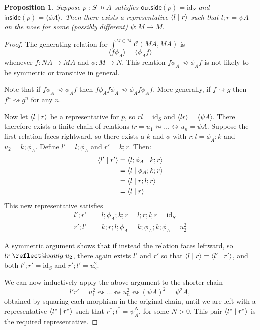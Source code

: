 \documentclass[11pt,a4paper]{article}
\makeatletter
\theoremstyle{plain}
\newtheorem{proposition}[theorem]{Proposition}
\theoremstyle{definition}
\newcommand{\C}{\mathscr{C}}
\newcommand{\M}{\mathscr{M}}
\newcommand{\id}{\mathrm{id}}
\newcommand{\rep}[2]{{\ensuremath \left\langle #1 \mid #2 \right\rangle}}
\newcommand{\inside}{\mathsf{inside}}
\newcommand{\outside}{\mathsf{outside}}
\newcommand{\hto}{\ensuremath{\,\mathaccent\shortmid\rightarrow\,}}
\providecommand{\leftsquigarrow}{%
  \mathrel{\mathpalette\reflect@squig\relax}%
}
\newcommand{\reflect@squig}[2]{%
  \reflectbox{$\m@th#1\rightsquigarrow$}%
}
\makeatother
\begin{document}
\begin{proposition}\label{prop-onthenose}
  Suppose $p : S \hto A$ satisfies $\outside(p) = \id_S$ and $\inside(p) = \langle \phi A \rangle$. Then there exists a representative $\rep{l}{r }$ such that $l ; r = \psi A$ on the nose for some (possibly different) $\psi : M \to M$.
\end{proposition}
\begin{proof}
  The generating relation for $\int^{M \in \M} \C(M A, M A)$ is 
  \[ \langle f \phi_A \rangle = \langle \phi_A f \rangle \] 
  whenever $f : N A \to M A$ and $\phi : M \to N$. This relation $f \phi_A \rightsquigarrow \phi_A f$ is not likely to be symmetric or transitive in general.

  Note that if $f \phi_A \rightsquigarrow \phi_A f$ then $f \phi_A f \phi_A \rightsquigarrow \phi_A f \phi_A f$. More generally, if $f \rightsquigarrow g$ then $f^n \rightsquigarrow g^n$ for any $n$.
  
  Now let $\rep{l}{r}$ be a representative for $p$, so $rl = \id_S$ and $\langle lr \rangle = \langle \psi A\rangle$. There therefore exists a finite chain of relations $lr = u_1 \leftrightsquigarrow \dots \leftrightsquigarrow u_n = \psi A$. Suppose the first relation faces rightward, so there exists a $k$ and $\phi$ with $r;l = \phi_A;k$ and $u_2 = k;\phi_A$. Define $l' = l;\phi_A$ and $r' = k;r$. Then:
\begin{align*}
\rep{l'}{r'} 
&= \rep{l ; \phi_A}{k ; r} \\
&= \rep{l}{\phi_A ; k ; r} \\
&= \rep{l}{r ; l; r} \\
&= \rep{l}{r}
\end{align*}
This new representative satisfies
\begin{align*}
l';r' &= l;\phi_A;k;r = l;r;l;r = \id_S \\
r';l' &= k;r;l;\phi_A = k;\phi_A;k;\phi_A = u_2^2
\end{align*}

  A symmetric argument shows that if instead the relation faces leftward, so $lr \leftsquigarrow u_2$, there again exists $l'$ and $r'$ so that $\rep{l}{r} = \rep{l'}{r'}$, and both $l';r' = \id_S$ and $r';l' = u_2^2$.

  We can now inductively apply the above argument to the shorter chain \[l'r' = u_1^2 \leftrightsquigarrow \dots \leftrightsquigarrow u_n^2 \leftrightsquigarrow (\psi A)^2 = \psi^2 A,\] obtained by squaring each morphism in the original chain, until we are left with a representative $\rep{l^*}{r^*}$ such that $r^*;l^* = \psi^N_A$, for some $N>0$. This pair $\rep{l^*}{r^* }$ is the required representative.
\end{proof}
\end{document}
